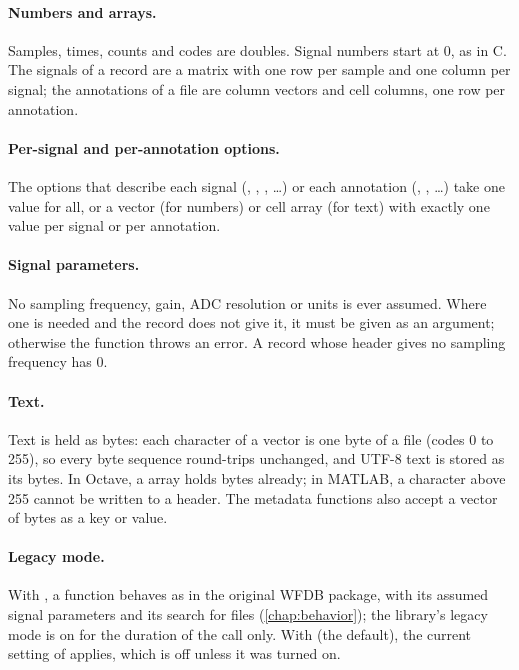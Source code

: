 \paragraph{Numbers and arrays.} Samples, times, counts and codes are doubles. Signal
numbers start at 0, as in C. The signals of a record are a matrix with one row per sample
and one column per signal; the annotations of a file are column vectors and cell columns,
one row per annotation.

\paragraph{Per-signal and per-annotation options.} The options that describe each signal
(, , , \ldots) or each annotation
(, , \ldots) take one value for all, or a vector (for
numbers) or cell array (for text) with exactly one value per signal or per annotation.

\paragraph{Signal parameters.} No sampling frequency, gain, ADC resolution or units is
ever assumed. Where one is needed and the record does not give it, it must be given as an
argument; otherwise the function throws an error. A record whose header gives no
sampling frequency has  0.

\paragraph{Text.} Text is held as bytes: each character of a  vector is one byte
of a file (codes 0 to 255), so every byte sequence round-trips unchanged, and UTF-8 text
is stored as its bytes. In Octave, a  array holds bytes already; in MATLAB, a
character above 255 cannot be written to a header. The metadata functions also accept a
 vector of bytes as a key or value.

\paragraph{Legacy mode.} With , a function behaves as in the
original WFDB package, with its assumed signal parameters and its search for files
(\cref{chap:behavior}); the library's legacy mode is on for the duration of the call
only. With  (the default), the current setting of
 applies, which is off unless it was turned on.

